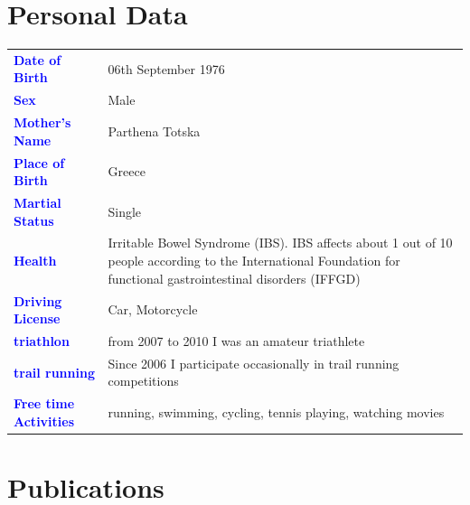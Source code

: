\documentclass[11pt, a4paper]{awesome-cv}
\begin{document}
\pagebreak

\bigskip
\bigskip

\hypertarget{personal-data}{%
\section{Personal Data}\label{personal-data}}

\bigskip

\begin{table}[H]
\centering\begingroup\fontsize{9}{11}\selectfont

\begin{tabular}{>{}l>{\raggedright\arraybackslash}p{30em}}
\toprule
\textcolor{blue}{\textbf{Date of Birth}} & 06th  September 1976\\
\textcolor{blue}{\textbf{Sex}} & Male\\
\textcolor{blue}{\textbf{Mother’s Name}} & Parthena Totska\\
\textcolor{blue}{\textbf{Place of Birth}} & Greece\\
\textcolor{blue}{\textbf{Martial Status}} & Single\\
\addlinespace
\textcolor{blue}{\textbf{Health}} & Irritable Bowel Syndrome (IBS).  IBS affects about 1 out of 10 people according to the International Foundation for functional gastrointestinal disorders (IFFGD)\\
\textcolor{blue}{\textbf{Driving License}} & Car,  Motorcycle\\
\textcolor{blue}{\textbf{triathlon}} & from 2007 to 2010 I was an amateur triathlete\\
\textcolor{blue}{\textbf{trail running}} & Since 2006 I participate occasionally in trail running competitions\\
\textcolor{blue}{\textbf{Free time Activities}} & running, swimming, cycling, tennis playing, watching movies\\
\bottomrule
\end{tabular}
\endgroup{}
\end{table}

\bigskip
\bigskip

\hypertarget{publications}{%
\section{Publications}\label{publications}}
\end{document}
